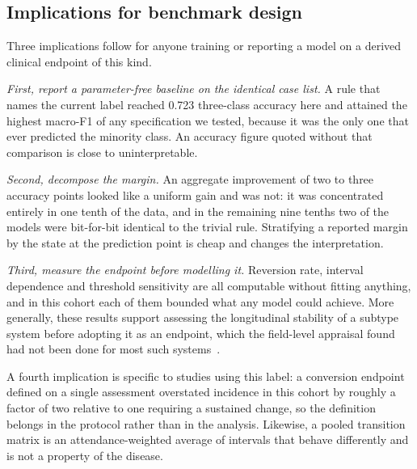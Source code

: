 \documentclass[journal]{IEEEtran}
\begin{document}
\subsection{Implications for benchmark design}
Three implications follow for anyone training or reporting a model on a derived
clinical endpoint of this kind.

\emph{First, report a parameter-free baseline on the identical case list.} A rule
that names the current label reached 0.723 three-class accuracy here and
attained the highest macro-F1 of any specification we tested, because it was the
only one that ever predicted the minority class. An accuracy figure quoted
without that comparison is close to uninterpretable.

\emph{Second, decompose the margin.} An aggregate improvement of two to three
accuracy points looked like a uniform gain and was not: it was concentrated
entirely in one tenth of the data, and in the remaining nine tenths two of the
models were bit-for-bit identical to the trivial rule. Stratifying a reported
margin by the state at the prediction point is cheap and changes the
interpretation.

\emph{Third, measure the endpoint before modelling it.} Reversion rate,
interval dependence and threshold sensitivity are all computable without fitting
anything, and in this cohort each of them bounded what any model could achieve.
More generally, these results support assessing the longitudinal stability of a
subtype system before adopting it as an endpoint, which the field-level
appraisal found had not been done for most such systems~\cite{mestre2021}.

A fourth implication is specific to studies using this label: a conversion
endpoint defined on a single assessment overstated incidence in this cohort by
roughly a factor of two relative to one requiring a sustained change, so the
definition belongs in the protocol rather than in the analysis. Likewise, a
pooled transition matrix is an attendance-weighted average of intervals that
behave differently and is not a property of the disease.
\end{document}

